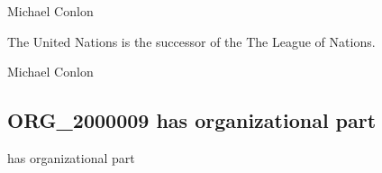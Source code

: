 \documentclass[letterpaper,10pt,english]{sphinxmanual}
\begin{document}
\begin{sphinxShadowBox}

\sphinxAtStartPar
Michael Conlon 
\end{sphinxShadowBox}

\begin{sphinxShadowBox}

\sphinxAtStartPar
{\hyperref[\detokenize{doc-ORG_0000001::doc}]{}}
\end{sphinxShadowBox}

\begin{sphinxShadowBox}

\sphinxAtStartPar
{\hyperref[\detokenize{doc-ORG_0000001::doc}]{}}
\end{sphinxShadowBox}

\begin{sphinxShadowBox}

\sphinxAtStartPar
The United Nations is the successor of the The League of Nations.
\end{sphinxShadowBox}

\begin{sphinxShadowBox}

\sphinxAtStartPar
{}
\end{sphinxShadowBox}

\begin{sphinxShadowBox}

\sphinxAtStartPar
Michael Conlon 
\end{sphinxShadowBox}
\begin{quote}

\ignorespaces \end{quote}


\subsection{ORG\_2000009 \sphinxhyphen{} has organizational part}
\label{\detokenize{doc-ORG_2000009:org-2000009-has-organizational-part}}\label{\detokenize{doc-ORG_2000009:index-0}}\label{\detokenize{doc-ORG_2000009::doc}}
\begin{sphinxShadowBox}

\sphinxAtStartPar
has organizational part
\end{sphinxShadowBox}
\end{document}
